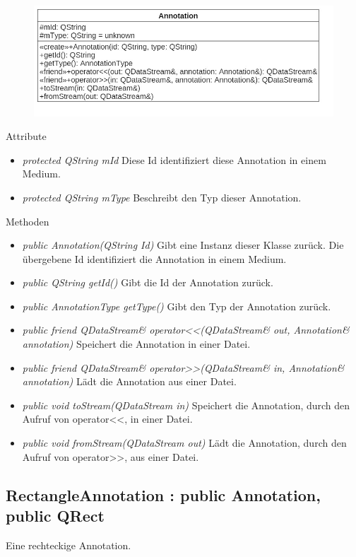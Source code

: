 \begin{figure}[H]
\centering
\includegraphics[scale=0.5]{img/Klassendiagramm/Klassen/Model/Annotation}
\label{fig:annotation}
\end{figure}

Attribute
\begin{itemize}
\item\textit{protected QString mId} Diese Id identifiziert diese Annotation in einem  Medium.
\item\textit{protected QString mType} Beschreibt den Typ dieser Annotation.
\end{itemize}

Methoden
\begin{itemize}
\item \textit{public Annotation(QString Id)} Gibt eine Instanz dieser Klasse zurück. Die übergebene Id identifiziert die Annotation in einem Medium.
\item \textit{public QString getId()} Gibt die Id der Annotation zurück.
\item \textit{public AnnotationType getType()} Gibt den Typ der Annotation zurück.
\item \textit{public friend QDataStream\& operator<<(QDataStream\& out, Annotation\& annotation)} Speichert die Annotation in einer Datei.
\item \textit{public friend QDataStream\& operator>>(QDataStream\& in, Annotation\& annotation)} Lädt die Annotation aus einer Datei.
\item \textit{public void toStream(QDataStream in)} Speichert die Annotation, durch den Aufruf von operator<<, in einer Datei.
\item \textit{public void fromStream(QDataStream out)} Lädt die Annotation, durch den Aufruf von operator>>, aus einer Datei.
\end{itemize}

\subsection*{RectangleAnnotation : public Annotation, public QRect}
Eine rechteckige Annotation.

